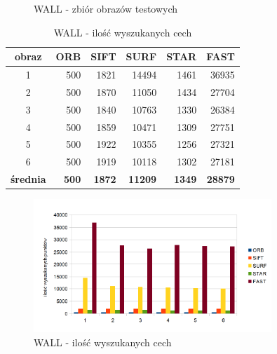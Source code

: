\begin{figure}[!htb]
\begin{center}
{}
\caption{WALL - zbiór obrazów testowych}
\label{fig:wall_set}
\end{center}
\end{figure}


\begin{table}[htbp]
  \centering
  \caption{WALL - ilość wyszukanych cech}
    \begin{tabular}{|c|r|r|r|r|r|}\hline
    
    obraz & \textbf{ORB} & \textbf{SIFT} & \textbf{SURF} & \textbf{STAR} & \textbf{FAST} \\\hline
    
    1 & 500 & 1821 & 14494 & 1461 & 36935 \\
    2 & 500 & 1870 & 11050 & 1434 & 27704 \\
    3 & 500 & 1840 & 10763 & 1330 & 26384 \\
    4 & 500 & 1859 & 10471 & 1309 & 27751 \\
    5 & 500 & 1922 & 10355 & 1256 & 27321 \\
    6 & 500 & 1919 & 10118 & 1302 & 27181 \\\hline
    \textbf{średnia} & \textbf{500} & \textbf{1872} & \textbf{11209} & \textbf{1349} & \textbf{28879} \\
    \hline
    \end{tabular}%
  \label{tab:wall_f1}%
\end{table}%


\begin{figure}
\centering
\includegraphics[width=0.8\textwidth]{pict/mikolajczyk/wall/f1.png}
\caption{WALL - ilość wyszukanych cech}
\label{fig:wall_f1}
\end{figure}


